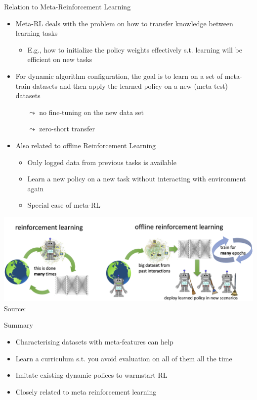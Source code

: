 \begin{frame}[c]{Relation to Meta-Reinforcement Learning}

	\begin{itemize}
	    \item Meta-RL deals with the problem on how to transfer knowledge between learning tasks
	    \begin{itemize}
	        \item E.g., how to initialize the policy weights effectively s.t. learning will be efficient on new tasks
	    \end{itemize}
	    \pause\smallskip
	    \item For dynamic algorithm configuration, the goal is to learn on a set of meta-train datasets and then apply the learned policy on a new (meta-test) datasets
	    \begin{itemize}
	        \item[$\leadsto$] no fine-tuning on the new data set
	        \item[$\leadsto$] zero-short transfer
	    \end{itemize}
	    \pause
	    \item Also related to offline Reinforcement Learning
	    \begin{itemize}
	        \item Only logged data from previous tasks is available
	        \item Learn a new policy on a new task without interacting with environment again
	        \item Special case of meta-RL
	    \end{itemize}
	\end{itemize}	
	
	\centering
	\includegraphics[width=.6\textwidth]{images/offline_rl.png} \footnotesize Source: 
	
\end{frame}
\begin{frame}[c]{Summary}

	\begin{itemize}
	    \item Characterising datasets with meta-features can help
	    \item Learn a curriculum s.t. you avoid evaluation on all of them all the time
	    \item Imitate existing dynamic polices to warmstart RL
	    \item Closely related to meta reinforcement learning
	\end{itemize}	
	
	
\end{frame}
